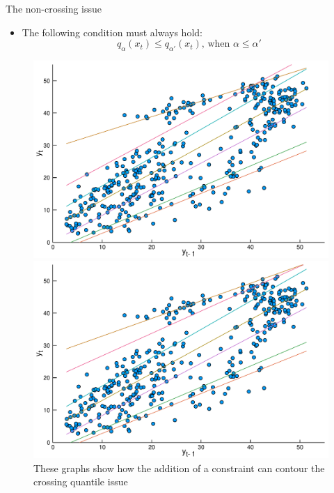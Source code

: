 \documentclass[11pt]{beamer}
\begin{document}
\begin{frame}{The non-crossing issue}

\begin{itemize}
	\item The following condition must always hold:
	$$q_\alpha(x_t) \leq q_{\alpha'}(x_t) \text{, when } \alpha \leq \alpha'$$
\end{itemize}

\begin{figure}
\centering
\begin{minipage}[t]{\linewidth}
\centering
\begin{minipage}[t]{0.45\linewidth}
\centering     \includegraphics[width=\textwidth]{Images/icaraizinho-quantile-linear-scatter-crossing}
\end{minipage}
\begin{minipage}[t]{0.45\linewidth}
\centering     \includegraphics[width=\textwidth]{Images/icaraizinho-quantile-linear-scatter}
\end{minipage}
\end{minipage}
\caption{These graphs show how the addition of a constraint can contour the crossing quantile issue}
\label{fig:quantiles-vs-xt}
\end{figure}

\end{frame}
\end{document}
